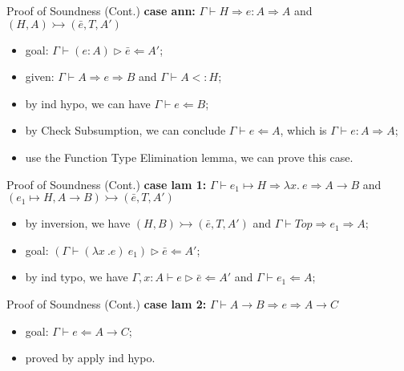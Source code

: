 \begin{frame}{Proof of Soundness (Cont.)}
	\textbf{case ann:} $\Gamma \vdash H \Rightarrow e : A \Rightarrow A$ and $(H, A) \rightarrowtail (\bar{e}, T, A')$
	
	\begin{itemize}
		\item goal: $\Gamma \vdash (e : A) \triangleright \bar{e} \Leftarrow A'$;
		\item given: $\Gamma \vdash A \Rightarrow e \Rightarrow B$ and $\Gamma \vdash A <: H$;
		\item by ind hypo, we can have $\Gamma \vdash e \Leftarrow B$;
		\item by \textcolor{oc-red-8}{Check Subsumption}, we can conclude $\Gamma \vdash e \Leftarrow A$, which is $\Gamma \vdash e : A \Rightarrow A$;
		\item use the \textcolor{oc-red-8}{Function Type Elimination} lemma, we can prove this case.
	\end{itemize}
\end{frame}

\begin{frame}{Proof of Soundness (Cont.)}
	\textbf{case lam 1:} $\Gamma \vdash \boxed{e_1} \mapsto H \Rightarrow \lambda x .~e \Rightarrow A \rightarrow B$ and $(\boxed{e_1} \mapsto H, A \rightarrow B) \rightarrowtail (\bar{e}, T, A')$
	\begin{itemize}
		\item by inversion, we have $(H, B) \rightarrowtail (\bar{e}, T, A')$ and $\Gamma \vdash Top \Rightarrow e_1 \Rightarrow A$;
		\item goal: $(\Gamma \vdash (\lambda x~.e) ~ e_1) \triangleright \bar{e} \Leftarrow A'$;
		\item by ind typo, we have $\Gamma , x : A \vdash e \triangleright \bar{e} \Leftarrow A'$ and $\Gamma \vdash e_1 \Leftarrow A$;
	\end{itemize}
\end{frame}

\begin{frame}{Proof of Soundness (Cont.)}
	\textbf{case lam 2:}	$\Gamma \vdash A \rightarrow B \Rightarrow e \Rightarrow A \rightarrow C$
	\begin{itemize}
		\item goal: $\Gamma \vdash e \Leftarrow A \rightarrow C$;
		\item proved by apply ind hypo.
	\end{itemize}
\end{frame}

